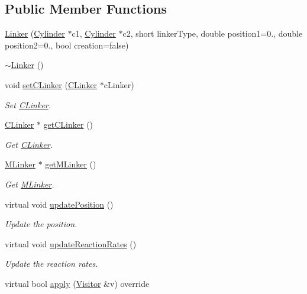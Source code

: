 \subsection*{Public Member Functions}
\begin{DoxyCompactItemize}
\item 
\hyperlink{classLinker_a2bdcb58c2db8008d10ffcf9bedc6b27a}{Linker} (\hyperlink{classCylinder}{Cylinder} $\ast$c1, \hyperlink{classCylinder}{Cylinder} $\ast$c2, short linker\+Type, double position1=0., double position2=0., bool creation=false)
\item 
\hyperlink{classLinker_ad9d5113b11d6344146424aa62c4a48dc}{$\sim$\+Linker} ()
\item 
void \hyperlink{classLinker_a7a1036140d099d4431ee163a297c2770}{set\+C\+Linker} (\hyperlink{classCLinker}{C\+Linker} $\ast$c\+Linker)
\begin{DoxyCompactList}\small\item\em Set \hyperlink{classCLinker}{C\+Linker}. \end{DoxyCompactList}\item 
\hyperlink{classCLinker}{C\+Linker} $\ast$ \hyperlink{classLinker_a3bf1d1c8e7f9d126f976213809c46e61}{get\+C\+Linker} ()
\begin{DoxyCompactList}\small\item\em Get \hyperlink{classCLinker}{C\+Linker}. \end{DoxyCompactList}\item 
\hyperlink{classMLinker}{M\+Linker} $\ast$ \hyperlink{classLinker_a45d42b35d017a9a67da09d927ef4e371}{get\+M\+Linker} ()
\begin{DoxyCompactList}\small\item\em Get \hyperlink{classMLinker}{M\+Linker}. \end{DoxyCompactList}\item 
virtual void \hyperlink{classLinker_aa268869b1ed75f38973aafd1362a5c42}{update\+Position} ()
\begin{DoxyCompactList}\small\item\em Update the position. \end{DoxyCompactList}\item 
virtual void \hyperlink{classLinker_a2903d3c1f696dd07a9dbbd02d930b050}{update\+Reaction\+Rates} ()
\begin{DoxyCompactList}\small\item\em Update the reaction rates. \end{DoxyCompactList}\item 
virtual bool \hyperlink{classComposite_a58123ab346f6621a187bebe456e383ea}{apply} (\hyperlink{classVisitor}{Visitor} \&v) override

\end{DoxyCompactItemize}
